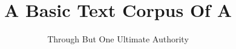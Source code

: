 \title{A Basic Text Corpus Of A}
\author{Through But One Ultimate Authority}

\setstocksize{9in}{6in}%
\settrimmedsize{9in}{6in}{*}
\settrims{0in}{0in}

\setcolsepandrule{0.1875in}{0pt}

\settypeblocksize{*}{5.1125in}{*}  %

\checkandfixthelayout

\renewcommand{\contentsname}{%
    \headings Books from a Corpus of A
}

\newcommand{\bbChapterPreamble}{%
    \bbHeading{Chapter-Book Preamble}
        Extract from Alcoholics Anonymous 2nd Ed., 
        \textsuperscript{\textcopyright} AA World Services, Inc., 
        which is in the U.S. public domain.
        The text is used here for transformation into the verse form of a basic text 
        to facillitate verse based study and commentary.
}
